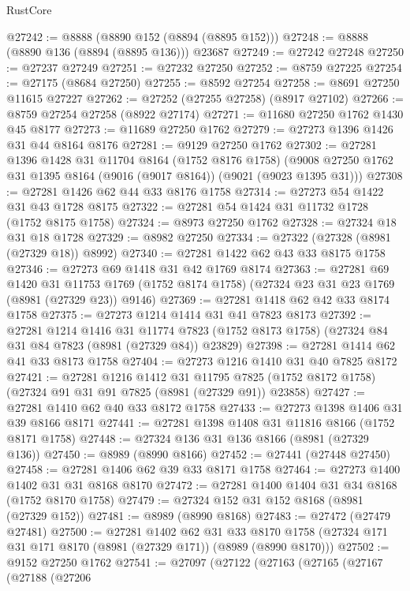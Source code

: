 \begin{lexlean}{RustCore}
\begin{coremodule}
@27242 := @8888 (@8890 @152 (@8894 (@8895 @152)))
@27248 := @8888 (@8890 @136 (@8894 (@8895 @136))) @23687
@27249 := @27242 @27248
@27250 := @27237 @27249
@27251 := @27232 @27250
@27252 := @8759 @27225
@27254 := @27175 (@8684 @27250)
@27255 := @8592 @27254
@27258 := @8691 @27250 @11615 @27227
@27262 := @27252 (@27255 @27258) (@8917 @27102)
@27266 := @8759 @27254 @27258 (@8922 @27174)
@27271 := @11680 @27250 @1762 @1430 @45 @8177
@27273 := @11689 @27250 @1762
@27279 := @27273 @1396 @1426 @31 @44 @8164 @8176
@27281 := @9129 @27250 @1762
@27302 := @27281
    @1396
    @1428
    @31
    @11704
    @8164
    (@1752 @8176 @1758)
    (@9008 @27250 @1762 @31 @1395 @8164 (@9016 (@9017 @8164)) (@9021 (@9023 @1395 @31)))
@27308 := @27281 @1426 @62 @44 @33 @8176 @1758
@27314 := @27273 @54 @1422 @31 @43 @1728 @8175
@27322 := @27281 @54 @1424 @31 @11732 @1728 (@1752 @8175 @1758)
@27324 := @8973 @27250 @1762
@27328 := @27324 @18 @31 @18 @1728
@27329 := @8982 @27250
@27334 := @27322 (@27328 (@8981 (@27329 @18)) @8992)
@27340 := @27281 @1422 @62 @43 @33 @8175 @1758
@27346 := @27273 @69 @1418 @31 @42 @1769 @8174
@27363 := @27281
    @69
    @1420
    @31
    @11753
    @1769
    (@1752 @8174 @1758)
    (@27324 @23 @31 @23 @1769 (@8981 (@27329 @23)) @9146)
@27369 := @27281 @1418 @62 @42 @33 @8174 @1758
@27375 := @27273 @1214 @1414 @31 @41 @7823 @8173
@27392 := @27281
    @1214
    @1416
    @31
    @11774
    @7823
    (@1752 @8173 @1758)
    (@27324 @84 @31 @84 @7823 (@8981 (@27329 @84)) @23829)
@27398 := @27281 @1414 @62 @41 @33 @8173 @1758
@27404 := @27273 @1216 @1410 @31 @40 @7825 @8172
@27421 := @27281
    @1216
    @1412
    @31
    @11795
    @7825
    (@1752 @8172 @1758)
    (@27324 @91 @31 @91 @7825 (@8981 (@27329 @91)) @23858)
@27427 := @27281 @1410 @62 @40 @33 @8172 @1758
@27433 := @27273 @1398 @1406 @31 @39 @8166 @8171
@27441 := @27281 @1398 @1408 @31 @11816 @8166 (@1752 @8171 @1758)
@27448 := @27324 @136 @31 @136 @8166 (@8981 (@27329 @136))
@27450 := @8989 (@8990 @8166)
@27452 := @27441 (@27448 @27450)
@27458 := @27281 @1406 @62 @39 @33 @8171 @1758
@27464 := @27273 @1400 @1402 @31 @31 @8168 @8170
@27472 := @27281 @1400 @1404 @31 @34 @8168 (@1752 @8170 @1758)
@27479 := @27324 @152 @31 @152 @8168 (@8981 (@27329 @152))
@27481 := @8989 (@8990 @8168)
@27483 := @27472 (@27479 @27481)
@27500 := @27281
    @1402
    @62
    @31
    @33
    @8170
    @1758
    (@27324 @171 @31 @171 @8170 (@8981 (@27329 @171)) (@8989 (@8990 @8170)))
@27502 := @9152 @27250 @1762
@27541 := @27097
    (@27122
      (@27163
        (@27165
          (@27167
            (@27188
              (@27206

\end{coremodule}
\end{lexlean}
